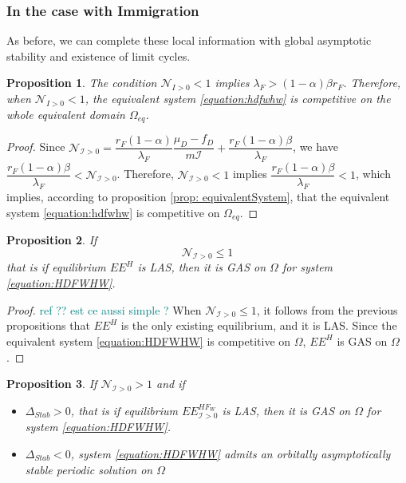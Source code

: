\documentclass{article}
\newcommand{\lfw}{\lambda_{F}}
\newcommand{\lfw}{\lambda_{F}}
\newcommand{\cI}{\mathcal{I}}
\newcommand{\marc}[1]{\textcolor{teal}{#1}}
\newtheorem{prop}{Proposition}
\begin{document}
\subsubsection{In the case with Immigration}

As before, we can complete these local information with global asymptotic stability and existence of limit cycles. 

\begin{prop}
The condition $\mathcal{N}_{I > 0} < 1$ implies $\lfw > (1-\alpha) \beta r_F$. Therefore, when $\mathcal{N}_{I > 0} < 1$, the equivalent system \eqref{equation:hdfwhw} is competitive on the whole equivalent domain $\Omega_{eq}$.
\end{prop}

\begin{proof}
Since $\mathcal{N}_{\cI > 0} = \dfrac{r_F(1-\alpha)}{\lfw}\dfrac{\mu_D - f_D}{m \cI} + \dfrac{r_F(1-\alpha) \beta}{\lfw}$, we have $\dfrac{r_F(1-\alpha) \beta}{\lfw} < \mathcal{N}_{\cI > 0}$. Therefore, $\mathcal{N}_{\cI > 0} < 1$ implies $\dfrac{r_F(1-\alpha) \beta}{\lfw} < 1$, which implies, according to proposition \ref{prop: equivalentSystem}, that the equivalent system \eqref{equation:hdfwhw} is competitive on $\Omega_{eq}$.
\end{proof}

\begin{prop}\label{prop:EEHGAS}
If $$\mathcal{N}_{\cI > 0} \leq 1$$
that is if equilibrium $EE^{H}$ is LAS, then it is GAS on $\Omega$ for system \eqref{equation:HDFWHW}.
\end{prop}

\begin{proof} \marc{ref ?? est ce aussi simple ?}
When $\mathcal{N}_{\cI > 0} \leq 1$, it follows from the previous propositions that $EE^{H}$ is the only existing equilibrium, and it is LAS. Since the equivalent system \eqref{equation:HDFWHW} is competitive on $\Omega$, $EE^{H}$ is GAS on $\Omega$.
\end{proof}


\begin{prop}
If $\mathcal{N}_{\cI > 0} > 1$ and if 

\begin{itemize}
\item $\Delta_{Stab} > 0$, that is if equilibrium $EE^{HF_W}_{\cI >0}$ is LAS, then it is GAS on $\Omega$ for system \eqref{equation:HDFWHW}.
\item $\Delta_{Stab} < 0$, system \eqref{equation:HDFWHW} admits an orbitally asymptotically stable periodic solution on $\Omega$
\end{itemize}
\end{prop}
\end{document}
